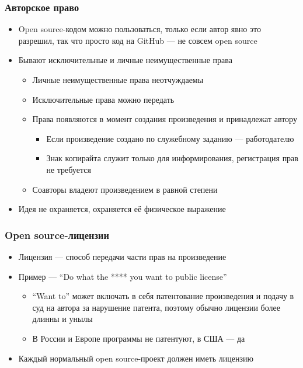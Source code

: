 \documentclass{../../slides-style}
\begin{document}
    \begin{frame}
        \frametitle{Авторское право}
        \begin{itemize}
            \item Open source-кодом можно пользоваться, только если автор явно это разрешил, так что просто код на GitHub --- не совсем open source
            \item Бывают исключительные и личные неимущественные права
            \begin{itemize}
                \item Личные неимущественные права неотчуждаемы
                \item Исключительные права можно передать
                \item Права появляются в момент создания произведения и принадлежат автору
                \begin{itemize}
                    \item Если произведение создано по служебному заданию --- работодателю
                    \item Знак копирайта служит только для информирования, регистрация прав не требуется
                \end{itemize}
                \item Соавторы владеют произведением в равной степени
            \end{itemize}
            \item Идея не охраняется, охраняется её физическое выражение
        \end{itemize}
    \end{frame}

    \begin{frame}
        \frametitle{Open source-лицензии}
        \begin{itemize}
            \item Лицензия --- способ передачи части прав на произведение
            \item Пример --- ``Do what the **** you want to public license''
            \begin{itemize}
                \item ``Want to'' может включать в себя патентование произведения и подачу в суд на автора за нарушение патента, поэтому обычно лицензии более длинны и унылы
                \item В России и Европе программы не патентуют, в США --- да
            \end{itemize}
            \item Каждый нормальный open source-проект должен иметь лицензию
        \end{itemize}
    \end{frame}
\end{document}
